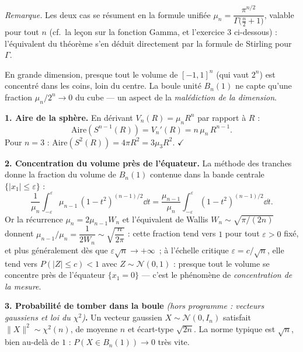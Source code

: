 \emph{Remarque.} Les deux cas se résument en la formule unifiée
$\mu_n = \dfrac{\pi^{n/2}}{\Gamma\bigl(\frac{n}{2}+1\bigr)}$, valable pour tout $n$
(cf.\ la leçon sur la fonction Gamma, et l'exercice 3 ci-dessous) : l'équivalent
du théorème s'en déduit directement par la formule de Stirling pour $\Gamma$.

En grande dimension, presque tout le volume de $[-1,1]^n$ (qui vaut $2^n$) est concentré
dans les coins, loin du centre. La boule unité $B_n(1)$ ne capte qu'une fraction
$\mu_n/2^n \to 0$ du cube — un aspect de la \emph{malédiction de la
dimension}.

\decsep{}



\begin{mdframed}[style=exbar]
  \textbf{1. Aire de la sphère.}\enspace%
  En dérivant $V_n(R) = \mu_n R^n$ par rapport à $R$ :
  \[
    \mathrm{Aire}(S^{n-1}(R)) = V_n'(R) = n\,\mu_n\,R^{n-1}.
  \]
  Pour $n=3$ : $\mathrm{Aire}(S^2(R)) = 4\pi R^2 = 3\mu_3 R^2$. $\checkmark$

  \smallskip\noindent
  \textbf{2. Concentration du volume près de l'équateur.}\enspace%
  La méthode des tranches donne la fraction du volume de $B_n(1)$ contenue dans
  la bande centrale $\{|x_1| \leq \varepsilon\}$ :
  \[
    \frac{1}{\mu_n}\int_{-\varepsilon}^{\varepsilon}\mu_{n-1}\,{(1-t^2)}^{(n-1)/2}\dd t
    = \frac{\mu_{n-1}}{\mu_n}\int_{-\varepsilon}^{\varepsilon}{(1-t^2)}^{(n-1)/2}\dd t.
  \]
  Or la récurrence $\mu_n = 2\mu_{n-1}W_n$ et l'équivalent de Wallis
  $W_n \sim \sqrt{\pi/(2n)}$ donnent
  $\mu_{n-1}/\mu_n = \dfrac{1}{2W_n} \sim \sqrt{\dfrac{n}{2\pi}}$ :
  cette fraction tend vers $1$ pour tout
  $\varepsilon > 0$ fixé, et plus généralement dès que $\varepsilon\sqrt{n}\to+\infty$~;
  à l'échelle critique $\varepsilon = c/\sqrt{n}$, elle tend vers
  $P(|Z| \leq c) < 1$ avec $Z \sim \mathcal{N}(0,1)$ : presque tout le
  volume se concentre près de l'équateur $\{x_1 = 0\}$ — c'est le phénomène
  de \emph{concentration de la mesure}.

  \smallskip\noindent
  \textbf{3. Probabilité de tomber dans la boule} \emph{(hors programme : vecteurs
  gaussiens et loi du $\chi^2$)}\textbf{.}\enspace%
  Un vecteur gaussien $X \sim \mathcal{N}(0,I_n)$ satisfait $\|X\|^2 \sim \chi^2(n)$,
  de moyenne $n$ et écart-type $\sqrt{2n}$. La norme typique est $\sqrt{n}$,
  bien au-delà de $1$ : $P(X \in B_n(1)) \to 0$ très vite.
\end{mdframed}


